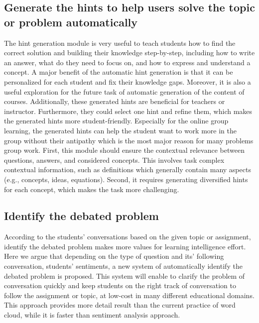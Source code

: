 \documentclass[letterpaper%
, twoside%
, 12pt%
,these%
, english%
,creativecommons,hyperref, withAlgo2e %
]{thETS}
\begin{document}
\subsection{Generate the hints to help users solve the topic or problem automatically}
The hint generation module is very useful to teach students how to find the correct solution and building their knowledge step-by-step, including how to write an answer, what do they need to focus on, and how to express and understand a concept. A major benefit of the automatic hint generation is that it can be personalized for each student and fix their knowledge gaps. Moreover, it is also a useful exploration for the future task of automatic generation of the content of courses. Additionally, these generated hints are beneficial for teachers or instructor. Furthermore, they could select one hint and refine them, which makes the generated hints more student-friendly. Especially for the online group learning, the generated hints can help the student want to work more in the group without their antipathy which is the most major reason for many problems group work. First, this module should ensure the contextual relevance between questions, answers, and considered concepts. This involves task complex contextual information, such as definitions which generally contain many aspects (e.g., concepts, ideas, equations). Second, it requires generating diversified hints for each concept, which makes the task more challenging.

\subsection{Identify the debated problem}

According to the students' conversations based on the given topic or assignment, identify the debated problem makes more values for learning intelligence effort. Here we argue that depending on the type of question and its’ following conversation, students' sentiments, a new system of automatically identify the debated problem is proposed. This system will enable to clarify the problem of conversation quickly and keep students on the right track of conversation to follow the assignment or topic, at low-cost in many different educational domains. This approach provides more
detail result than the current practice of word cloud, while it is
faster than sentiment analysis approach.
\end{document}
